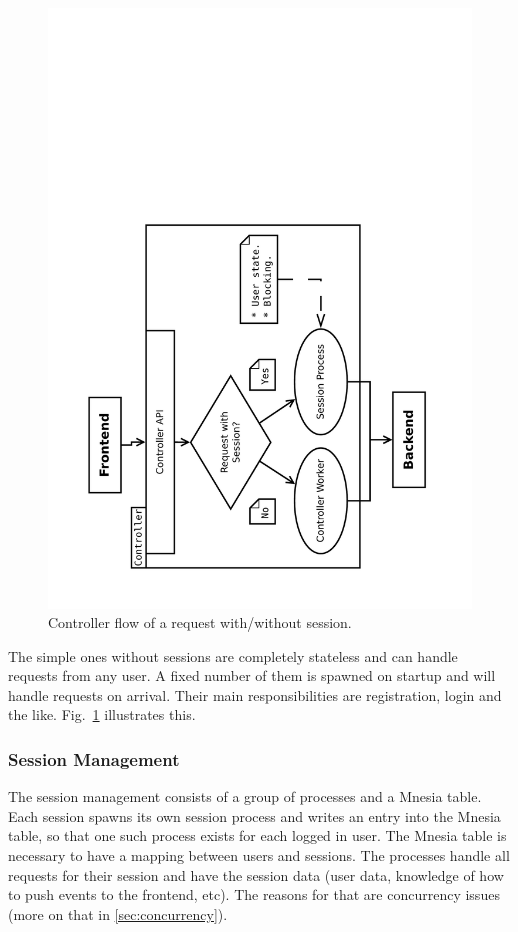 \documentclass[11pt,a4paper]{report}
\begin{document}
\begin{figure}[h]
 \centering
 \includegraphics[width=13cm, angle=-90]{./graphics/Concurrency_-_session_proc.pdf}
 \vspace{-1cm}
 \caption{Controller flow of a request with/without session.}
 \label{fig:controller:session_proc}
\end{figure}

The simple ones without sessions are completely stateless and can handle
requests from any user.
A fixed number of them is spawned on startup and will handle requests on
arrival.
Their main responsibilities are registration, login and the like.
Fig.~\ref{fig:controller:session_proc} illustrates this.

\subsubsection{Session Management}
The session management consists of a group of processes and a Mnesia table.
Each session spawns its own session process and writes an entry into the Mnesia
table, so that one such process exists for each logged in user.
The Mnesia table is necessary to have a mapping between users and sessions.
The processes handle all requests for their session and have the session data
(user data, knowledge of how to push events to the frontend, etc).
The reasons for that are concurrency issues
(more on that in \ref{sec:concurrency}).
\end{document}
